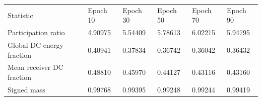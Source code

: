 \begin{tabular}{llllll}
\hline
Statistic & Epoch 10 & Epoch 30 & Epoch 50 & Epoch 70 & Epoch 90 \\
Participation ratio & 4.90975 & 5.54409 & 5.78613 & 6.02215 & 5.94795 \\
Global DC energy fraction & 0.40941 & 0.37834 & 0.36742 & 0.36042 & 0.36432 \\
Mean receiver DC fraction & 0.48810 & 0.45970 & 0.44127 & 0.43116 & 0.43160 \\
Signed mass & 0.99768 & 0.99395 & 0.99248 & 0.99244 & 0.99419 \\
\hline
\end{tabular}
